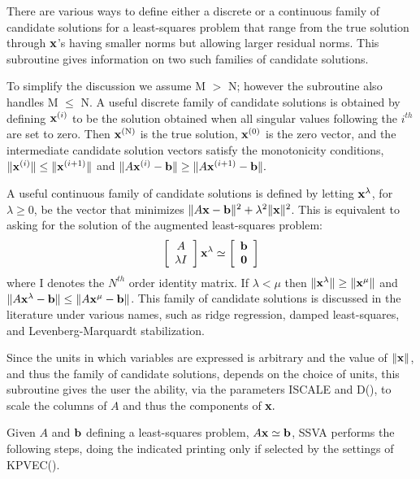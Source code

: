 \documentclass[twoside]{MATH77}
\begin{document}
There are various ways to define either a discrete or a continuous family of
candidate solutions for a least-squares problem that range from the true
solution through ${\bf x}$'s having smaller norms but allowing
larger residual norms. This subroutine gives information on two such
families of candidate solutions.

To simplify the discussion we assume M $>$ N; however the subroutine also
handles M $\leq $ N. A useful discrete family of candidate solutions is
obtained by defining ${\bf x}^{(i)}$ to be the solution obtained when all
singular values following the $i^{th}$ are set to zero. Then ${\bf x}^{(%
\text{N})}$ is the true solution, ${\bf x}^{(0)}$ is the zero vector, and
the intermediate candidate solution vectors satisfy the monotonicity
conditions, $\Vert {\bf x}^{(i)}\Vert \leq \Vert {\bf x}^{(i+1)}\Vert $ and $%
\Vert A{\bf x}^{(i)}-{\bf b}\Vert \geq \Vert A{\bf x}^{(i+1)}-{\bf b}\Vert .$

A useful continuous family of candidate solutions is defined by letting $%
{\bf x}^\lambda $, for $\lambda \geq 0$, be the vector that minimizes $\Vert
A{\bf x}-{\bf b}\Vert ^2+\lambda ^2\Vert {\bf x}\Vert ^2$. This is
equivalent to asking for the solution of the augmented least-squares problem:%
\begin{equation*}
\left[
\begin{array}{c}
A \\
\lambda I
\end{array}
\right] {\bf x}^\lambda \simeq \left[
\begin{array}{c}
{\bf b} \\ {\bf 0}
\end{array}
\right]
\end{equation*}
where I denotes the $N^{th}$ order identity matrix. If $\lambda <\mu $ then $%
\Vert {\bf x}^\lambda \Vert \geq \Vert {\bf x}^\mu \Vert $ and $\Vert A{\bf x%
}^\lambda -{\bf b}\Vert \leq \Vert A{\bf x}^\mu -{\bf b}\Vert $. This family
of candidate solutions is discussed in the literature under various names,
such as ridge regression, damped least-squares, and Levenberg-Marquardt
stabilization.

Since the units in which variables are expressed is arbitrary and the value
of $\|{\bf x}\|$, and thus the family of candidate solutions, depends on the
choice of units, this subroutine gives the user the ability, via the
parameters ISCALE and D(), to scale the columns of $A$ and thus the
components of ${\bf x}.$

Given $A$ and ${\bf b}$ defining a least-squares problem, $A{\bf x} \simeq
{\bf b}$, SSVA performs the following steps, doing the indicated printing
only if selected by the settings of KPVEC().
\end{document}
